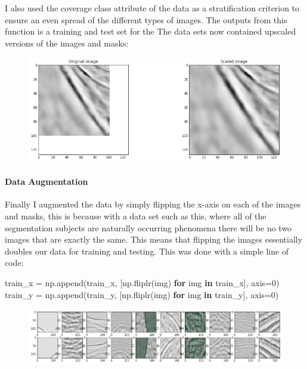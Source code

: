 \documentclass[11pt]{article}
\makeatletter
\def\maxwidth{\ifdim\Gin@nat@width>\linewidth\linewidth
    \else\Gin@nat@width\fi}
\let\Oldincludegraphics\includegraphics
\renewcommand{\includegraphics}[1]{\Oldincludegraphics[width=.8\maxwidth]{#1}}
\newenvironment{Shaded}{}{}
\newcommand{\KeywordTok}[1]{\textcolor[rgb]{0.00,0.44,0.13}{\textbf{{#1}}}}
\newcommand{\DecValTok}[1]{\textcolor[rgb]{0.25,0.63,0.44}{{#1}}}
\newcommand{\NormalTok}[1]{{#1}}
\newcommand{\ControlFlowTok}[1]{\textcolor[rgb]{0.00,0.44,0.13}{\textbf{{#1}}}}
\newcommand{\OperatorTok}[1]{\textcolor[rgb]{0.40,0.40,0.40}{{#1}}}
\makeatother
\begin{document}
I also used the coverage class attribute of the data as a stratification
criterion to ensure an even spread of the different types of images. The
outputs from this function is a training and test set for the The data
sets now contained upscaled versions of the images and masks:

\begin{figure}
\centering
\includegraphics{pictures/upscaled.png}
\caption{}
\end{figure}

\paragraph{Data Augmentation}\label{data-augmentation}

Finally I augmented the data by simply flipping the x-axis on each of
the images and masks, this is because with a data set such as this,
where all of the segmentation subjects are naturally occurring phenomena
there will be no two images that are exactly the same. This means that
flipping the images essentially doubles our data for training and
testing. This was done with a simple line of code:

\begin{Shaded}
\begin{Highlighting}[]
\NormalTok{train_x }\OperatorTok{=}\NormalTok{ np.append(train_x, [np.fliplr(img) }\ControlFlowTok{for}\NormalTok{ img }\KeywordTok{in}\NormalTok{ train_x], axis}\OperatorTok{=}\DecValTok{0}\NormalTok{)}
\NormalTok{train_y }\OperatorTok{=}\NormalTok{ np.append(train_y, [np.fliplr(img) }\ControlFlowTok{for}\NormalTok{ img }\KeywordTok{in}\NormalTok{ train_y], axis}\OperatorTok{=}\DecValTok{0}\NormalTok{)}
\end{Highlighting}
\end{Shaded}

\begin{figure}
\centering
\includegraphics{pictures/flipped.png}
\caption{}
\end{figure}
\end{document}
